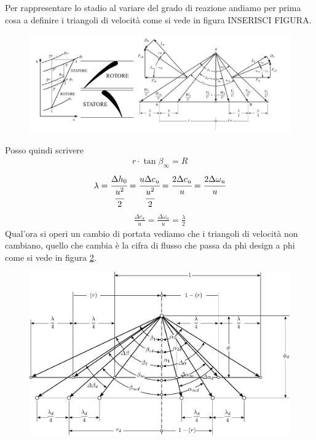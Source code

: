Per rappresentare lo stadio al variare del grado di reazione andiamo per prima cosa a definire i triangoli di velocità come si vede in figura INSERISCI FIGURA.
\begin{figure}
\centering
  \includegraphics[width=\textwidth]{fig/StadioRipetuto.pdf}
\caption{}
\label{fig:StadioRipetuto}
\end{figure}
Posso quindi scrivere
\begin{align*}
r \cdot \tan \beta_{\infty} = R 
\end{align*}
\begin{align*}
\lambda = \cfrac{\Delta h_0}{\cfrac{u^2}{2}} = \cfrac{u \Delta c_u}{\cfrac{u^2}{2}} = \cfrac{2 \Delta c_u}{u} = \cfrac{2 \Delta \omega_u}{u}
\end{align*}
\begin{align*}
\frac{\Delta c_u}{u} = \frac{\Delta \omega_u}{u} = \frac{\lambda}{2}
\end{align*}
Qual'ora si operi un cambio di portata vediamo che i triangoli di velocità non cambiano, quello che cambia è la cifra di flusso che passa da phi design a phi come si vede in figura \ref{fig:CondFuoriProg}.
\begin{figure}
\centering
  \includegraphics[width=\textwidth]{fig/CondFuoriProg.pdf}
\caption{}
\label{fig:CondFuoriProg}
\end{figure}
